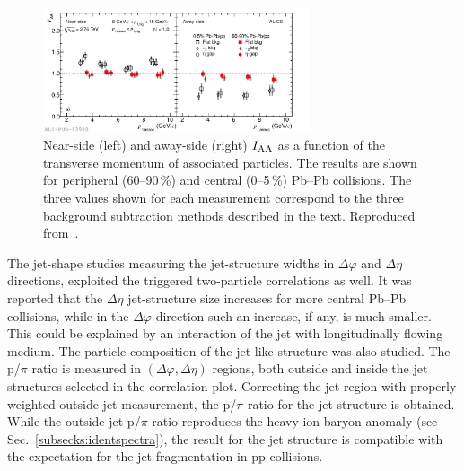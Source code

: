 \begin{figure}
\centering
\includegraphics[width=0.7\textwidth]{ksfigures/IAA.pdf}
\caption{Near-side (left) and away-side (right) $I_{\rm AA}$ as a function of the transverse momentum of associated particles. The results are shown for peripheral (60--90\,\%) and central (0--5\,\%) Pb--Pb collisions. The three values shown for each measurement correspond to the three background subtraction methods described in the text. Reproduced from~\cite{Aamodt:2011vg}.}
\label{figks:IAA}
\end{figure}

The jet-shape studies measuring the jet-structure widths in $\Delta\varphi$ and $\Delta\eta$ directions, exploited the triggered two-particle correlations as well. It was reported that the $\Delta\eta$ jet-structure size increases for more central Pb--Pb collisions, while in the $\Delta\varphi$ direction such an increase, if any, is much smaller. This could be explained by an interaction of the jet with longitudinally flowing medium. The particle composition of the jet-like structure was also studied. The p/$\pi$ ratio is measured in $(\Delta\varphi, \Delta\eta)$ regions, both outside and inside the jet structures selected in the correlation plot. Correcting the jet region with properly weighted outside-jet measurement, the p/$\pi$ ratio for the jet structure is obtained. While the outside-jet p/$\pi$ ratio reproduces the heavy-ion baryon anomaly (see Sec.~\ref{subsecks:identspectra}), the result for the jet structure is compatible with the expectation for the jet fragmentation in pp collisions.

